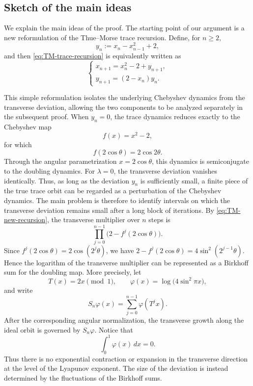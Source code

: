 \documentclass{amsart}
\theoremstyle{definition}
\begin{document}
\subsection{Sketch of the main ideas}

We explain the main ideas of the proof. The starting point of our
argument is a new reformulation of the Thue--Morse trace recursion.
Define, for $n\ge2$,
\[
    y_n:=x_n-x_{n-1}^2+2,
\]
and then \eqref{eq:TM-trace-recursion} is equivalently written as
\begin{equation}
    \begin{cases}
        x_{n+1}=x_n^2-2+y_{n+1},\\[1mm]
        y_{n+1}=(2-x_n)y_n.
    \end{cases}
    \label{eq:TM-new-recursion}
\end{equation}

This simple reformulation isolates the underlying Chebyshev dynamics from the transverse deviation, allowing the two components to be analyzed separately in the subsequent proof.
When \(y_n=0\), the trace dynamics reduces exactly to the Chebyshev map
\[
    f(x)=x^2-2,
\]
for which
\[
    f(2\cos\theta)=2\cos2\theta.
\]
Through the angular parametrization \(x=2\cos\theta\), this dynamics is
semiconjugate to the doubling dynamics. 
For $\lambda=0$, the transverse deviation vanishes identically.
Thus, as long as the deviation
\(y_n\) is sufficiently small, a finite piece of the true trace orbit
can be regarded as a perturbation of the Chebyshev dynamics. 
The main problem is therefore to identify intervals on which 
the transverse deviation remains small after a long block of iterations.
By \eqref{eq:TM-new-recursion}, the transverse multiplier over \(n\)
steps is
\[
    \prod_{j=0}^{n-1}
    \bigl(2-f^j(2\cos\theta)\bigr).
\]
Since $f^j(2\cos\theta)=2\cos(2^j\theta)$, 
we have $2-f^j(2\cos\theta) =  4\sin^2(2^{j-1}\theta).$
Hence the logarithm of the transverse multiplier can be represented as
a Birkhoff sum for the doubling map. More precisely, let
\[
    T(x)=2x\pmod1,
    \qquad
    \varphi(x)=\log\bigl(4\sin^2\pi x\bigr),
\]
and write
\[
    S_n\varphi(x)
    =
    \sum_{j=0}^{n-1}\varphi(T^j x).
\]
After the corresponding angular normalization, the transverse growth
along the ideal orbit is governed by \(S_n\varphi\). Notice that
\[
    \int_0^1\varphi(x)\,dx=0.
\]
Thus there is no exponential contraction or expansion in the
transverse direction at the level of the Lyapunov exponent. The size
of the deviation is instead determined by the fluctuations of the
Birkhoff sums.
\end{document}
